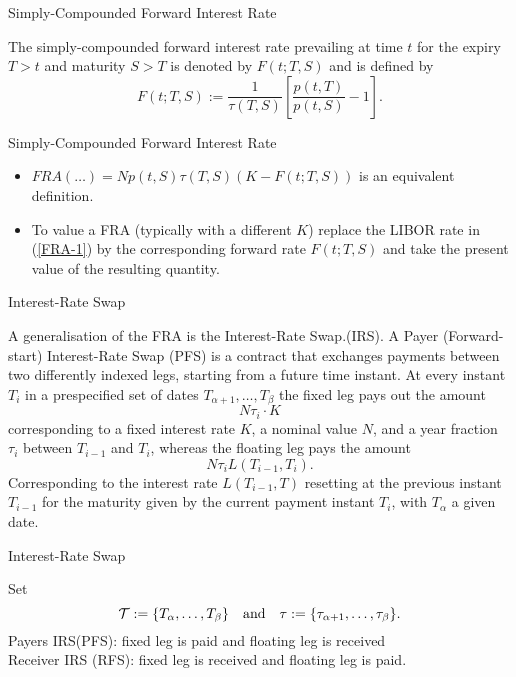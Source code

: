 {Simply-Compounded Forward Interest Rate}

The simply-compounded forward interest rate prevailing at time $t$
for the expiry $T>t$ and maturity $S>T$ is denoted by $F(t;T,S)$
and is defined by
\begin{equation}
F(t;T,S):=\frac{1}{\tau(T,S)} \left[\frac{p(t,T)}{p(t,S)}-1\right].
\end{equation}


{Simply-Compounded Forward Interest Rate}

\begin{itemize}
\item<1-> $FRA(\ldots)=Np(t,S)\tau(T,S)(K-F(t; T,S))$ is an
equivalent definition.
\item<2-> To value a FRA (typically with a different $K$) replace the LIBOR rate in (\ref{FRA-1}) by
the corresponding forward rate $F(t;T,S)$ and take the present
value of the resulting quantity.
\end{itemize}



{Interest-Rate Swap}

A generalisation
of the FRA is the Interest-Rate Swap.(IRS). A Payer (Forward-start)
Interest-Rate Swap (PFS) is a contract that exchanges payments
between two differently indexed legs, starting from a future time
instant. At every instant $T_i$ in a prespecified set of dates
$T_{\alpha+1},\ldots ,T_{\beta}$ the fixed leg pays out the amount
$$
N\tau_i\cdot K
$$
corresponding to a fixed interest rate $K$, a
nominal value $N$, and a year fraction $\tau_i$ between $T_{i-1}$
and $T_i$, whereas the floating leg pays the amount
$$
N\tau_i L(T_{i-1},T_i).
$$
Corresponding to the interest rate
$L(T_{i-1},T)$ resetting at the previous instant $T_{i-1}$ for the
maturity given by the current payment instant $T_i$, with
$T_{\alpha}$ a given date.


{Interest-Rate Swap}

Set
$${\cal T}:=\{T_{\alpha},\ldots ,T_{\beta}\}\quad\mbox{and}\quad
\tau:=\{\tau_{\alpha+1},\ldots,\tau_{\beta}\}.
$$
Payers IRS(PFS):
fixed leg is paid and floating leg is received \\
Receiver IRS (RFS): fixed leg is received and floating leg is
paid.

